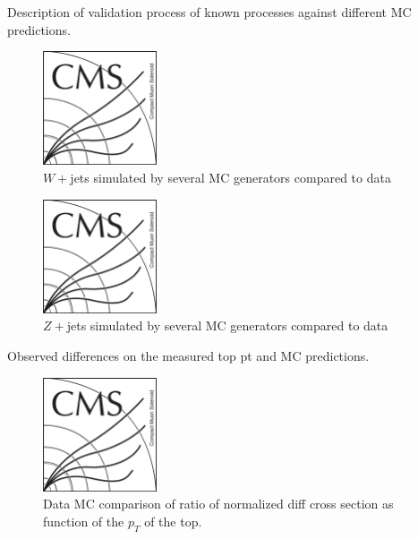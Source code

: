 Description of validation process of known processes against different MC predictions.

\begin{figure}[!Hhtbp]
  \begin{center}
    \includegraphics[width=0.3\textwidth]{figs/CMSlogo.png}
    \caption{$W+$jets simulated by several MC generators compared to data}
    \label{fig:WVal}
  \end{center}
\end{figure}

\begin{figure}[!Hhtbp]
  \begin{center}
    \includegraphics[width=0.3\textwidth]{figs/CMSlogo.png}
    \caption{$Z+$jets simulated by several MC generators compared to data}
    \label{fig:WVal}
  \end{center}
\end{figure}

Observed differences on the measured top pt and MC predictions.

\begin{figure}[!Hhtbp]
  \begin{center}
    \includegraphics[width=0.3\textwidth]{figs/CMSlogo.png}
    \caption{Data MC comparison of ratio of normalized diff cross section as function of the $p_{T}$ of the top.}
    \label{fig:WVal}
  \end{center}
\end{figure}

